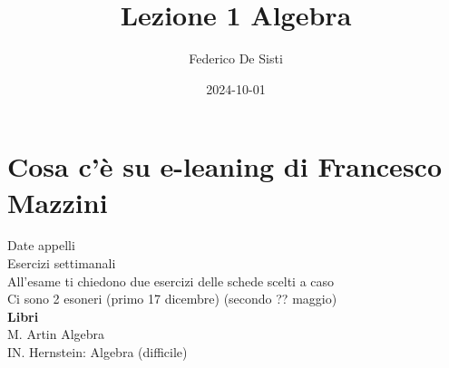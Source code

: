 \documentclass[12px]{article}
\title{Lezione 1 Algebra}
\date{2024-10-01}
\author{Federico De Sisti}
\begin{document}
	\maketitle
	\newpage
	\section{Cosa c'è su e-leaning di Francesco Mazzini}
	Date appelli\\
	Esercizi settimanali\\
	All'esame ti chiedono due esercizi delle schede scelti a caso\\
	Ci sono 2 esoneri (primo 17 dicembre) (secondo ?? maggio)\\
\textbf{Libri}\\
M. Artin Algebra\\
IN. Hernstein: Algebra (difficile)\\
\end{document}
